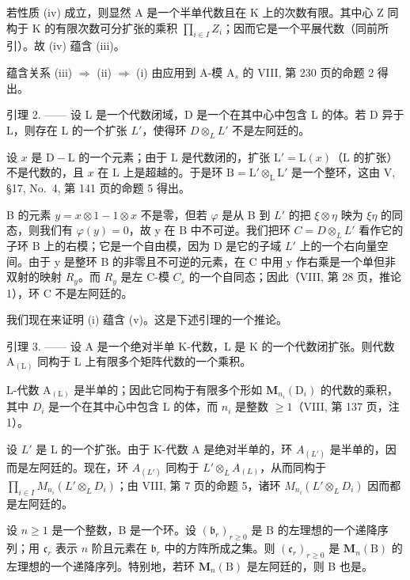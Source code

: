 若性质 (iv) 成立，则显然 A 是一个半单代数且在 K 上的次数有限。其中心 Z 同构于 K 的有限次数可分扩张的乘积 \(\prod_{i\in I}Z_{i}\)；因而它是一个平展代数（同前所引）。故 (iv) 蕴含 (iii)。

蕴含关系 (iii) \(\Rightarrow\) (ii) \(\Rightarrow\) (i) 由应用到 A-模 \(\mathrm{A}_s\) 的 VIII, 第 230 页的命题 2 得出。

引理 2. —— 设 L 是一个代数闭域，D 是一个在其中心中包含 L 的体。若 D 异于 L，则存在 L 的一个扩张 \(L'\)，使得环 \(D \otimes_{L} L'\) 不是左阿廷的。

设 \(x\) 是 \(\mathrm{D} - \mathrm{L}\) 的一个元素；由于 \(\mathrm{L}\) 是代数闭的，扩张 \(\mathrm{L}' = \mathrm{L}(x)\)（\(\mathrm{L}\) 的扩张）不是代数的，且 \(x\) 在 \(\mathrm{L}\) 上是超越的。于是环 \(\mathrm{B} = \mathrm{L}' \otimes_{\mathrm{L}} \mathrm{L}'\) 是一个整环，这由 \(\mathrm{V}\), §17, No.~4, 第 141 页的命题 5 得出。

B 的元素 \(y = x \otimes 1 - 1 \otimes x\) 不是零，但若 \(\varphi\) 是从 B 到 \(L'\) 的把 \(\xi \otimes \eta\) 映为 \(\xi \eta\) 的同态，则我们有 \(\varphi(y) = 0\)，故 y 在 B 中不可逆。我们把环 \(C = D \otimes_{L} L'\) 看作它的子环 B 上的右模；它是一个自由模，因为 D 是它的子域 \(L'\) 上的一个右向量空间。由于 y 是整环 B 的非零且不可逆的元素，在 C 中用 y 作右乘是一个单但非双射的映射 \(R_y\)。而 \(R_y\) 是左 C-模 \(C_s\) 的一个自同态；因此（VIII, 第 28 页，推论 1），环 C 不是左阿廷的。

我们现在来证明 (i) 蕴含 (v)。这是下述引理的一个推论。

引理 3. —— 设 A 是一个绝对半单 K-代数，L 是 K 的一个代数闭扩张。则代数 \(\mathrm{A}_{(\mathrm{L})}\) 同构于 L 上有限多个矩阵代数的一个乘积。

L-代数 \(\mathrm{A}_{(\mathrm{L})}\) 是半单的；因此它同构于有限多个形如 \(\mathbf{M}_{n_{i}}(\mathrm{D}_{i})\) 的代数的乘积，其中 \(D_{i}\) 是一个在其中心中包含 L 的体，而 \(n_{i}\) 是整数 \(\geqslant 1\)（VIII, 第 137 页，注 1）。

设 \(L'\) 是 L 的一个扩张。由于 K-代数 A 是绝对半单的，环 \(A_{(L')}\) 是半单的，因而是左阿廷的。现在，环 \(A_{(L')}\) 同构于 \(L' \otimes_L A_{(L)}\)，从而同构于 \(\prod_{i \in I} M_{n_i}(L' \otimes_L D_i)\)；由 VIII, 第 7 页的命题 5，诸环 \(M_{n_i}(L' \otimes_L D_i)\) 因而都是左阿廷的。

设 \(n \geqslant 1\) 是一个整数，B 是一个环。设 \((\mathfrak{b}_r)_{r \geqslant 0}\) 是 B 的左理想的一个递降序列；用 \(\mathfrak{c}_r\) 表示 \(n\) 阶且元素在 \(\mathfrak{b}_r\) 中的方阵所成之集。则 \((\mathfrak{c}_r)_{r \geqslant 0}\) 是 \(\mathbf{M}_n(\mathrm{B})\) 的左理想的一个递降序列。特别地，若环 \(\mathbf{M}_n(\mathrm{B})\) 是左阿廷的，则 B 也是。

